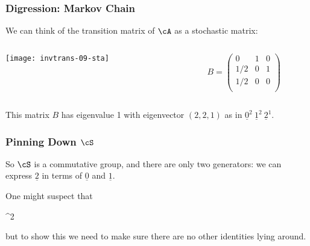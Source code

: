 \documentclass[handout,10pt]{ksbeamer}
\def\F#1{\underline{#1}}
\begin{document}
\begin{frame}
\frametitle{Digression: Markov Chain}

We can think of the transition matrix of $\cA$ as a stochastic matrix:

\begin{columns}
\begin{column}{0.4\textwidth}

\texttt{[image: invtrans-09-sta]}

\end{column}

\begin{column}{0.4\textwidth}
$$
B = \left(
\begin{array}{ccc}
 0 & 1 & 0 \\
 1/2  & 0 & 1 \\
 1/2 & 0 & 0 \\
\end{array}
\right)
$$

\end{column}
\end{columns}
\vspace{5ex} 

This matrix $B$ has eigenvalue 1 with eigenvector  $(2,2,1)$ as in 
$\F{0}^{2} \: \F{1}^{2} \: \F{2}^{1}$. 



\end{frame}


\begin{frame}
\frametitle{Pinning Down $\cS$}

So $\cS$ is a commutative group, and there are only two generators:
we can express $\F{2}$ in terms of $\F{0}$ and $\F{1}$.
\vspace{5ex} 

One might suspect that 
\vspace{2ex}

\begin{mathyellowbox}
\cS \cong \Z^{2}
\end{mathyellowbox}
\vspace{2ex}

but to show this we need to make sure there are no other identities lying around.

\end{frame}
\end{document}
